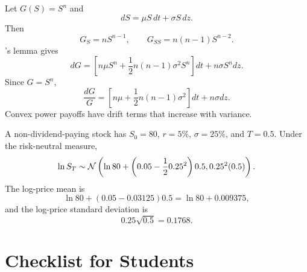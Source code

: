 \begin{exmp}
Let $G(S)=S^n$ and
\[
    dS=\mu S\,dt+\sigma S\,dz.
\]
Then
\[
    G_S=nS^{n-1},
    \qquad
    G_{SS}=n(n-1)S^{n-2}.
\]
\Ito's lemma gives
\[
    dG
    =
    \left[
        n\mu S^n
        +
        \frac{1}{2}n(n-1)\sigma^2S^n
    \right]dt
    +
    n\sigma S^n dz.
\]
Since $G=S^n$,
\[
    \frac{dG}{G}
    =
    \left[
        n\mu+\frac{1}{2}n(n-1)\sigma^2
    \right]dt
    +
    n\sigma dz.
\]
Convex power payoffs have drift terms that increase with variance.
\end{exmp}

\begin{exmp}
A non-dividend-paying stock has $S_0=80$, $r=5\%$, $\sigma=25\%$, and
$T=0.5$. Under the risk-neutral measure,
\[
    \ln S_T
    \sim
    \mathcal{N}\left(
        \ln 80+\left(0.05-\frac{1}{2}0.25^2\right)0.5,
        0.25^2(0.5)
    \right).
\]
The log-price mean is
\[
    \ln 80+(0.05-0.03125)0.5
    =
    \ln 80+0.009375,
\]
and the log-price standard deviation is
\[
    0.25\sqrt{0.5}=0.1768.
\]
\end{exmp}

\section{Checklist for Students}

